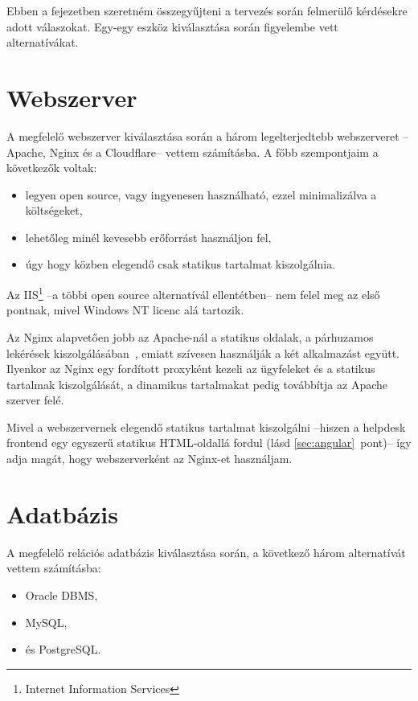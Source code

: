 Ebben a fejezetben szeretném összegyűjteni a tervezés során felmerülő kérdésekre adott válaszokat. Egy-egy eszköz kiválasztása során figyelembe vett alternatívákat.




\section{Webszerver}
A megfelelő webszerver kiválasztása során a három legelterjedtebb\cite{W3Techs_Usage_statistics_of_webservers} webszerveret --Apache, Nginx és a Cloudflare-- vettem számításba. A főbb szempontjaim a következők voltak:
\begin{itemize}
	\item legyen open source, vagy ingyenesen használható, ezzel minimalizálva a költségeket,
	\item lehetőleg minél kevesebb erőforrást használjon fel,
	\item úgy hogy közben elegendő csak statikus tartalmat kiszolgálnia.
\end{itemize}

Az IIS\footnote{Internet Information Services} --a többi open source alternatívál ellentétben-- nem felel meg az első pontnak, mivel Windows NT licenc alá tartozik.

Az Nginx alapvetően jobb az Apache-nál a statikus oldalak, a párhuzamos lekérések kiszolgálásában~\cite{nginx_performance}, emiatt szívesen használják a két alkalmazást együtt. Ilyenkor az Nginx egy fordított proxyként kezeli az ügyfeleket és a statikus tartalmak kiszolgálását, a dinamikus tartalmakat pedig továbbítja az Apache szerver felé.

Mivel a webszervernek elegendő statikus tartalmat kiszolgálni --hiszen a helpdesk frontend egy egyszerű statikus HTML-oldallá fordul (lásd \ref{sec:angular}~pont)-- így adja magát, hogy webszerverként az Nginx-et használjam.




\section{Adatbázis}
A megfelelő relációs adatbázis kiválasztása során, a következő három alternatívát vettem számításba:
\begin{itemize}
	\item Oracle DBMS,
	\item MySQL,
	\item és PostgreSQL.
\end{itemize}

